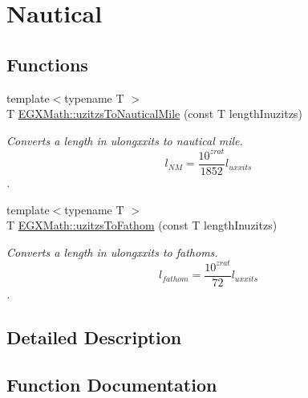 \hypertarget{group___e_g_x_math-_conversions-_length_conversions-_imperial-uzitzs-_nautical}{}\section{Nautical}
\label{group___e_g_x_math-_conversions-_length_conversions-_imperial-uzitzs-_nautical}
\subsection*{Functions}
\begin{DoxyCompactItemize}
\item 
{\footnotesize template$<$typename T $>$ }\\T \mbox{\hyperlink{group___e_g_x_math-_conversions-_length_conversions-_imperial-uzitzs-_nautical_ga71c06fc85e22f77eba0b234edefa4562}{E\+G\+X\+Math\+::uzitzs\+To\+Nautical\+Mile}} (const T length\+Inuzitzs)
\begin{DoxyCompactList}\small\item\em Converts a length in ulongxxits to nautical mile. \[ l_{NM}= \frac{10^{zrat}}{1852} l_{uxxits} \]. \end{DoxyCompactList}\item 
{\footnotesize template$<$typename T $>$ }\\T \mbox{\hyperlink{group___e_g_x_math-_conversions-_length_conversions-_imperial-uzitzs-_nautical_gaaff17ba6c6a9c899108fccf746059d03}{E\+G\+X\+Math\+::uzitzs\+To\+Fathom}} (const T length\+Inuzitzs)
\begin{DoxyCompactList}\small\item\em Converts a length in ulongxxits to fathoms. \[ l_{fathom}= \frac{10^{zrat}}{72} l_{uxxits} \]. \end{DoxyCompactList}\end{DoxyCompactItemize}


\subsection{Detailed Description}


\subsection{Function Documentation}
\mbox{\label{group___e_g_x_math-_conversions-_length_conversions-_imperial-uzitzs-_nautical_gaaff17ba6c6a9c899108fccf746059d03}} 
